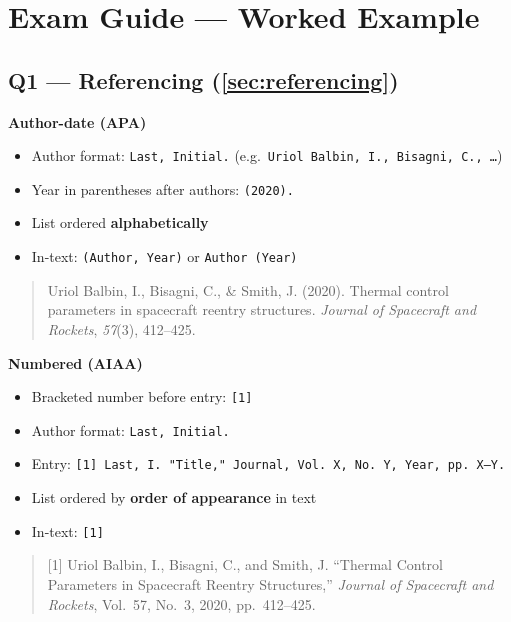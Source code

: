 \documentclass[../main.tex]{subfiles}
\begin{document}
\chapter*{Exam Guide --- Worked Example}
\label{ch:exam}

\section*{Q1 — Referencing (\autoref{sec:referencing})}

\textbf{Author-date (APA)}
\begin{itemize}
  \item Author format: \texttt{Last, Initial.} (e.g.\ \texttt{Uriol Balbin, I., Bisagni, C., \ldots})
  \item Year in parentheses after authors: \texttt{(2020).}
  \item List ordered \textbf{alphabetically}
  \item In-text: \texttt{(Author, Year)} or \texttt{Author (Year)}
\end{itemize}

\begin{quote}\small
Uriol Balbin, I., Bisagni, C., \& Smith, J. (2020). Thermal control parameters in spacecraft reentry structures. \textit{Journal of Spacecraft and Rockets}, \textit{57}(3), 412--425.
\end{quote}

\textbf{Numbered (AIAA)}
\begin{itemize}
  \item Bracketed number before entry: \texttt{[1]}
  \item Author format: \texttt{Last, Initial.}
  \item Entry: \texttt{[1] Last, I. "Title," Journal, Vol. X, No. Y, Year, pp. X--Y.}
  \item List ordered by \textbf{order of appearance} in text
  \item In-text: \texttt{[1]}
\end{itemize}

\begin{quote}\small
{[1]} Uriol Balbin, I., Bisagni, C., and Smith, J. ``Thermal Control Parameters in Spacecraft Reentry Structures,'' \textit{Journal of Spacecraft and Rockets}, Vol.~57, No.~3, 2020, pp.~412--425.
\end{quote}
\end{document}
